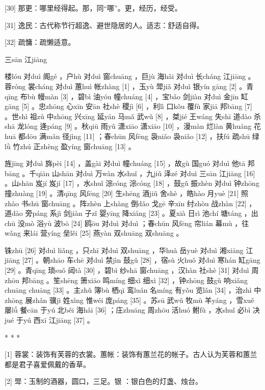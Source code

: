 \documentclass[12pt,UTF8]{ctexbook}
\begin{document}
[30] 那更：哪里经得起。那，同“哪”。更，经历，经受。

[31] 逸民：古代称节行超逸、避世隐居的人。适志：舒适自得。

[32] 疏慵：疏懒适意。





三sān 江jiāng


楼lóu 对duì 阁gé ，户hù 对duì 窗chuāng ，巨jù 海hǎi 对duì 长cháng 江jiāng 。蓉róng 裳cháng 对duì 蕙huì 帐zhàng [1] ，玉yù 斝jiǎ 对duì 银yín gāng [2] 。青qīng 布bù 幔màn [3] ，碧bì 油yóu 幢chuáng [4] ，宝bǎo 剑jiàn 对duì 金jīn 缸gāng [5] 。忠zhōng 心xīn 安ān 社shè 稷jì [6] ，利lì 口kǒu 覆fù 家jiā 邦bāng [7] 。世shì 祖zǔ 中zhōng 兴xīng 延yán 马mǎ 武wǔ [8] ，桀jié 王wáng 失shī 道dào 杀shā 龙lóng 逄páng [9] 。秋qiū 雨yǔ 潇xiāo 潇xiāo [10] ，漫màn 烂làn 黄huáng 花huā 都dōu 满mǎn 径jìng [11] ；春chūn 风fēng 袅niǎo 袅niǎo [12] ，扶fú 疏shū 绿lǜ 竹zhú 正zhèng 盈yíng 窗chuāng [13] 。

旌jīng 对duì 旆pèi [14] ，盖gài 对duì 幢chuáng [15] ，故gù 国guó 对duì 他tā 邦bāng 。千qiān 山shān 对duì 万wàn 水shuǐ ，九jiǔ 泽zé 对duì 三sān 江jiāng [16] 。山shān 岌jí 岌jí [17] ，水shuǐ 淙cóng 淙cóng [18] ，鼓gǔ 振zhèn 对duì 钟zhōng 撞zhuàng [19] 。清qīng 风fēng [20] 生shēng 酒jiǔ 舍shè ，皓hào 月yuè [21] 照zhào 书shū 窗chuāng 。阵zhèn 上shàng 倒dǎo 戈gē 辛xīn 纣zhòu 战zhàn [22] ，道dào 旁páng 系jì 剑jiàn 子zǐ 婴yīng 降xiáng [23] 。夏xià 日rì 池chí 塘táng ，出chū 没mò 浴yù 波bō [24] 鸥ōu 对duì 对duì ；春chūn 风fēng 帘lián 幕mù ，往wǎng 来lái 营yíng 垒lěi [25] 燕yàn 双shuāng 双shuāng 。

铢zhū [26] 对duì liǎng ，只zhī 对duì 双shuāng ，华huà 岳yuè 对duì 湘xiāng 江jiāng [27] 。朝zhāo 车chē 对duì 禁jìn 鼓gǔ [28] ，宿sù 火huǒ 对duì 寒hán 缸gāng [29] 。青qīng 琐suǒ 闼tà [30] ，碧bì 纱shā 窗chuāng ，汉hàn 社shè [31] 对duì 周zhōu 邦bāng 。笙shēng 箫xiāo 鸣míng 细xì 细xì [32] ，钟zhōng 鼓gǔ 响xiǎng chuāng chuāng [33] 。主zhǔ 簿bù 栖qī 鸾luán 名míng 有yǒu 览lǎn [34] ，治zhì 中zhōng 展zhǎn 骥jì 姓xìng 惟wéi 庞páng [35] 。苏sū 武wǔ 牧mù 羊yáng ，雪xuě 屡lǚ 餐cān 于yú 北běi 海hǎi [36] ；庄zhuāng 周zhōu 活huó 鲋fù ，水shuǐ 必bì 决jué 于yú 西xī 江jiāng [37] 。



* * *



[1] 蓉裳：装饰有芙蓉的衣裳。蕙帐：装饰有蕙兰花的帐子。古人认为芙蓉和蕙兰都是君子喜爱佩戴的香草。

[2] 斝：玉制的酒器，圆口，三足。银 ：银白色的灯盏、烛台。
\end{document}
